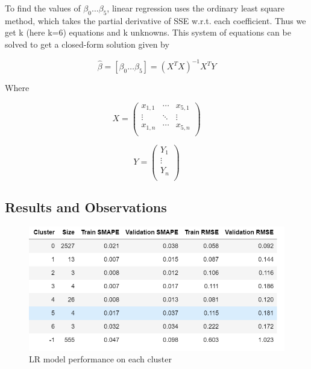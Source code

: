 \documentclass{article}
\begin{document}
To find the values of $\beta_0 \ldots \beta_5$, linear regression uses the ordinary least square method, which takes the partial derivative of SSE w.r.t. each coefficient. Thus we get k (here k=6) equations and k unknowns. This system of equations can be solved to get a closed-form solution given by 

$$
\hat{\beta} = [ \beta_0 \ldots \beta_5 ] = (X^TX)^{-1}X^TY
$$

 
Where 

\vspace{1em}

\begin{center}
	\begin{minipage}{0.45\linewidth}
		\[
		X = \begin{pmatrix}
			x_{1,1} & \cdots & x_{5,1} \\
			\vdots  & \ddots & \vdots \\
			x_{1,n} & \cdots & x_{5,n} \\
		\end{pmatrix}
		\]
	\end{minipage}
	\begin{minipage}{0.45\linewidth}
		\[
		Y = \begin{pmatrix}
			Y_1 \\
			\vdots \\
			Y_n \\
		\end{pmatrix}
		\]
	\end{minipage}
\end{center}

\vspace{1em}
\subsection{Results and Observations}

\vspace{1em}
\begin{figure}[h]
	\centering
	\includegraphics[width=0.8\linewidth]{images/lr_results}
	\caption{LR model performance on each cluster}
\end{figure}
\end{document}
